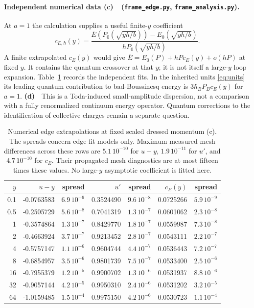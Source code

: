 \documentclass[11pt,a4paper]{article}
\newcommand{\Lc}{\textbf{(c)}\ }
\newcommand{\Ld}{\textbf{(d)}\ }
\newcommand{\ed}{\texttt{frame\_\allowbreak edge.py}}
\newcommand{\an}{\texttt{frame\_\allowbreak analysis.py}}
\begin{document}
\paragraph{Independent numerical data \Lc\ (\ed, \an).}
At $a=1$ the calculation supplies a useful finite-$y$ coefficient
\begin{equation}
 c_{E,h}(y)=\frac{\overline E(P_0(\sqrt{yh/b}))-E_0(\sqrt{yh/b})}{hP_0(\sqrt{yh/b})}.
 \label{eq:ce}
\end{equation}
A finite extrapolated $c_E(y)$ would give
$\overline E=E_0(P)+hP c_E(y)+o(hP)$ at fixed $y$.
It contains the quantum crossover at that $y$; it is not itself a
large-$y$ loop expansion. Table~\ref{tab:one} records the independent fits.
In the inherited units \eqref{eq:units} its leading quantum contribution to
bad-Boussinesq energy is $3\hbar_B P_B c_E(y)$ for $a=1$.
\Ld\ This is a Toda-induced small-amplitude dispersion, not a comparison
with a fully renormalized continuum energy operator. Quantum corrections to
the identification of collective charges remain a separate question.


\par
\begin{table}[ht]\centering\small
\setlength{\tabcolsep}{4pt}
\begin{tabular}{rrrrrrr}\toprule
$y$ & $u-y$ & spread & $u\prime$ & spread & $c_E(y)$ & spread\\\midrule
0.1 & -0.0763583 & $6.9\,10^{-9}$ & 0.3524490 & $9.6\,10^{-8}$ & 0.0725266 & $5.9\,10^{-9}$\\
0.5 & -0.2505729 & $5.6\,10^{-8}$ & 0.7041319 & $1.3\,10^{-7}$ & 0.0601062 & $2.3\,10^{-8}$\\
1 & -0.3574864 & $1.3\,10^{-7}$ & 0.8429770 & $1.8\,10^{-7}$ & 0.0559987 & $7.3\,10^{-8}$\\
2 & -0.4663924 & $3.7\,10^{-7}$ & 0.9213452 & $2.8\,10^{-7}$ & 0.0543111 & $2.2\,10^{-7}$\\
4 & -0.5757147 & $1.1\,10^{-6}$ & 0.9604744 & $4.4\,10^{-7}$ & 0.0536443 & $7.2\,10^{-7}$\\
8 & -0.6854957 & $3.5\,10^{-6}$ & 0.9801739 & $7.5\,10^{-7}$ & 0.0533400 & $2.5\,10^{-6}$\\
16 & -0.7955379 & $1.2\,10^{-5}$ & 0.9900702 & $1.3\,10^{-6}$ & 0.0531937 & $8.8\,10^{-6}$\\
32 & -0.9057144 & $4.2\,10^{-5}$ & 0.9950310 & $2.4\,10^{-6}$ & 0.0531202 & $3.2\,10^{-5}$\\
64 & -1.0159485 & $1.5\,10^{-4}$ & 0.9975150 & $4.2\,10^{-6}$ & 0.0530723 & $1.1\,10^{-4}$\\
\bottomrule\end{tabular}
\caption{Numerical edge extrapolations at fixed scaled dressed momentum (c). The spreads concern edge-fit models only. Maximum measured mesh differences across these rows are $5.1\,10^{-10}$ for $u-y$, $1.9\,10^{-11}$ for $u\prime$, and $4.7\,10^{-10}$ for $c_E$. Their propagated mesh diagnostics are at most fifteen times these values. No large-$y$ asymptotic coefficient is fitted here.}\label{tab:one}
\end{table}
\par
\end{document}
